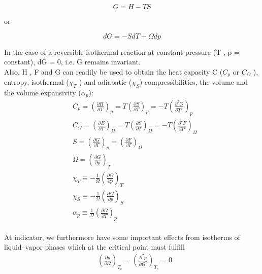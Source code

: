 \documentclass[12pt]{article}
\newcommand*{\1}{\hspace{1pt}}
\begin{document}
                \begin{equation}
                G = H - TS
                \end{equation}

or

                \begin{equation}
                dG = -S dT + \Omega dp
                \end{equation}

    In the case of a reversible isothermal reaction at constant pressure (T , p = constant),
    dG = 0, i.e. G remains invariant.\\

        Also, H , F and G can readily be used to obtain the heat capacity C ($C_{p}$ or $C_{\Omega}$ ),
    entropy, isothermal ($\chi _{T}$ ) and adiabatic ($\chi _{S}$) compressibilities, the volume and the volume
    expansivity ($\alpha  _{p}$):\\

    \begin{align}
    &  C_{p} = \left(\frac{\partial H }{ \partial T}\right)_{p} = T \left(\frac{\partial S}{\partial T} \right) _{p} = -T \left(\frac{\partial ^2 G }{ \partial T^2}\right) _p \\
    & C_{\Omega} = \left(\frac{\partial E }{ \partial T}\right)_{\Omega} = T \left(\frac{\partial S}{\partial T} \right) _{\Omega} = -T \left(\frac{\partial ^2 F }{ \partial T^2}\right) _\Omega \\
    & S = \left(\frac{\partial G }{ \partial T}\right)_{p} =  \left(\frac{\partial F}{\partial T} \right) _{\Omega} \\
    & \Omega  = \left(\frac{\partial G }{ \partial p}\right)_{T} \\
    & \chi _T  \equiv  - \frac{1}{ \Omega} \left(\frac{\partial  \Omega }{ \partial p}\right)_{T} \\ 
    & \chi _S  \equiv  - \frac{1}{ \Omega} \left(\frac{\partial  \Omega }{ \partial p}\right)_{S} \\
    & \alpha  _p  \equiv  \frac{1}{ \Omega} \left(\frac{\partial  \Omega }{ \partial T}\right)_{p}  
    \end{align}\\

    At indicator, we furthermore have some important effects from isotherms of liquid–vapor phases which at the critical point must fulfill
    \begin{align}
    & \left(\frac{\partial p}{\partial \Omega} \right) _{T_{c}} = \left(\frac{\partial ^2 p}{\partial \Omega ^2} \right) _{T_{c}} =0
    \end{align}\\
\end{document}
